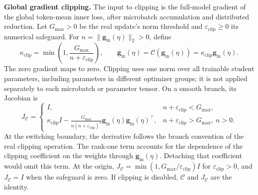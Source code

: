 \documentclass{article}
\theoremstyle{plain}
\theoremstyle{definition}
\theoremstyle{remark}
\begin{document}
\textbf{Global gradient clipping.}
The input to clipping is the full-model gradient of the global token-mean inner loss,
after microbatch accumulation and distributed reduction. Let \(G_{\max}>0\) be the real update's
norm threshold and \(\varepsilon_{\mathrm{clip}}\geq0\) its numerical safeguard. For
\(n=\|\boldsymbol g_{\mathrm{in}}(\eta)\|_2>0\), define
\begin{equation}
    \kappa_{\mathrm{clip}}=\min\!\left(1,\frac{G_{\max}}{n+\varepsilon_{\mathrm{clip}}}\right),
    \qquad
    \overline{\boldsymbol g}_{\mathrm{in}}(\eta)=\mathcal C(\boldsymbol g_{\mathrm{in}}(\eta))
    =\kappa_{\mathrm{clip}}\boldsymbol g_{\mathrm{in}}(\eta).
\label{eq:appendix-global-clip}
\end{equation}
The zero gradient maps to zero. Clipping uses one norm over all trainable student parameters,
including parameters in different optimizer groups; it is not applied separately to each
microbatch or parameter tensor. On a smooth branch, its Jacobian is
\begin{equation}
    J_{\mathcal C}=
    \begin{cases}
        I, & n+\varepsilon_{\mathrm{clip}}<G_{\max},\\[2pt]
        \displaystyle
        \kappa_{\mathrm{clip}} I-\frac{G_{\max}}{n(n+\varepsilon_{\mathrm{clip}})^2}
        \boldsymbol g_{\mathrm{in}}(\eta)\boldsymbol g_{\mathrm{in}}(\eta)^\top,
        & n+\varepsilon_{\mathrm{clip}}>G_{\max},\ n>0.
    \end{cases}
\label{eq:appendix-clip-jacobian}
\end{equation}
At the switching boundary, the derivative follows the branch convention of the real clipping
operation. The rank-one term accounts for the dependence of the clipping coefficient on the
weights through \(\boldsymbol g_{\mathrm{in}}(\eta)\). Detaching that coefficient would omit this term.
At the origin, \(J_{\mathcal C}=\min(1,G_{\max}/\varepsilon_{\mathrm{clip}})I\) for
\(\varepsilon_{\mathrm{clip}}>0\), and \(J_{\mathcal C}=I\) when the safeguard is zero.
If clipping is disabled, \(\mathcal C\) and \(J_{\mathcal C}\) are the identity.
\end{document}
